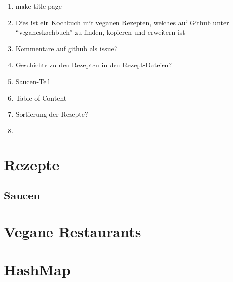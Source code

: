 \documentclass[12pt,a4paper]{article}
\begin{document}
\begin{enumerate}
	\item make title page
	\item Dies ist ein Kochbuch mit veganen Rezepten, welches auf Github unter \enquote{veganeskochbuch} zu finden, kopieren und erweitern ist.\\
	\item Kommentare auf github als issue?
	\item Geschichte zu den Rezepten in den Rezept-Dateien?
	\item Saucen-Teil
	\item Table of Content
	\item Sortierung der Rezepte?
	\item 
\end{enumerate}
\clearpage
\section{Rezepte}
	
	
	
	
	
	
	
\subsection[Saucen]{Saucen}
    
    
	
\section{Vegane Restaurants}
	
	
\section{HashMap}
	
\end{document}
